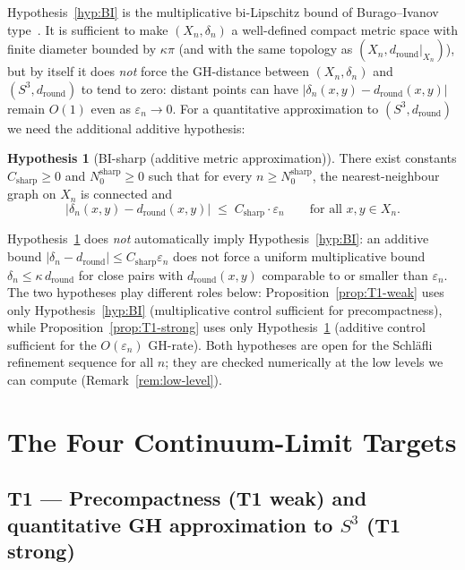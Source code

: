 \documentclass[12pt]{article}
\theoremstyle{definition}
\newtheorem{hypothesis}[theorem]{Hypothesis}
\theoremstyle{remark}
\begin{document}
Hypothesis~\ref{hyp:BI} is the multiplicative bi-Lipschitz bound of Burago--Ivanov type~\citep{BBI2001}. It is sufficient to make $(X_n, \delta_n)$ a well-defined compact metric space with finite diameter bounded by $\kappa \pi$ (and with the same topology as $(X_n, d_{\mathrm{round}}|_{X_n})$), but by itself it does \emph{not} force the GH-distance between $(X_n, \delta_n)$ and $(S^3, d_{\mathrm{round}})$ to tend to zero: distant points can have $|\delta_n(x,y) - d_{\mathrm{round}}(x,y)|$ remain $O(1)$ even as $\varepsilon_n \to 0$. For a quantitative approximation to $(S^3, d_{\mathrm{round}})$ we need the additional additive hypothesis:

\begin{hypothesis}[BI-sharp (additive metric approximation)]\label{hyp:BI-sharp}
There exist constants $C_{\mathrm{sharp}} \geq 0$ and $N_0^{\mathrm{sharp}} \geq 0$ such that for every $n \geq N_0^{\mathrm{sharp}}$, the nearest-neighbour graph on $X_n$ is connected and
\[
    \bigl|\delta_n(x,y) - d_{\mathrm{round}}(x,y)\bigr| \;\leq\; C_{\mathrm{sharp}} \cdot \varepsilon_n \qquad \text{for all } x, y \in X_n.
\]
\end{hypothesis}

Hypothesis~\ref{hyp:BI-sharp} does \emph{not} automatically imply Hypothesis~\ref{hyp:BI}: an additive bound $|\delta_n - d_{\mathrm{round}}| \leq C_{\mathrm{sharp}} \varepsilon_n$ does not force a uniform multiplicative bound $\delta_n \leq \kappa \, d_{\mathrm{round}}$ for close pairs with $d_{\mathrm{round}}(x,y)$ comparable to or smaller than $\varepsilon_n$. The two hypotheses play different roles below: Proposition~\ref{prop:T1-weak} uses only Hypothesis~\ref{hyp:BI} (multiplicative control sufficient for precompactness), while Proposition~\ref{prop:T1-strong} uses only Hypothesis~\ref{hyp:BI-sharp} (additive control sufficient for the $O(\varepsilon_n)$ GH-rate). Both hypotheses are open for the Schl\"afli refinement sequence for all $n$; they are checked numerically at the low levels we can compute (Remark~\ref{rem:low-level}).

\section{The Four Continuum-Limit Targets}\label{sec:targets}

\subsection*{T1 --- Precompactness (T1 weak) and quantitative GH approximation to $S^3$ (T1 strong)}
\end{document}
